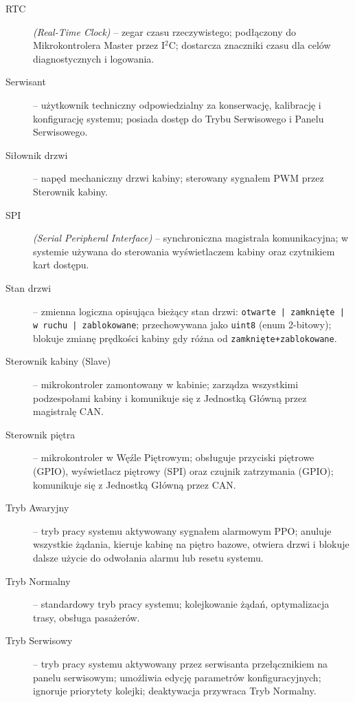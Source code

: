 \documentclass{article}
\begin{document}
\begin{description}
  \item[RTC] \textit{(Real-Time Clock)} – zegar czasu rzeczywistego; podłączony do Mikrokontrolera Master przez I$^2$C; dostarcza znaczniki czasu dla celów diagnostycznych i logowania.

  \item[Serwisant] – użytkownik techniczny odpowiedzialny za konserwację, kalibrację i konfigurację systemu; posiada dostęp do Trybu Serwisowego i Panelu Serwisowego.

  \item[Siłownik drzwi] – napęd mechaniczny drzwi kabiny; sterowany sygnałem PWM przez Sterownik kabiny.

  \item[SPI] \textit{(Serial Peripheral Interface)} – synchroniczna magistrala komunikacyjna; w systemie używana do sterowania wyświetlaczem kabiny oraz czytnikiem kart dostępu.

  \item[Stan drzwi] – zmienna logiczna opisująca bieżący stan drzwi: \texttt{otwarte | zamknięte | w ruchu | zablokowane}; przechowywana jako \texttt{uint8} (enum 2-bitowy); blokuje zmianę prędkości kabiny gdy różna od \texttt{zamknięte+zablokowane}.

  \item[Sterownik kabiny (Slave)] – mikrokontroler zamontowany w kabinie; zarządza wszystkimi podzespołami kabiny i komunikuje się z Jednostką Główną przez magistralę CAN.

  \item[Sterownik piętra] – mikrokontroler w Węźle Piętrowym; obsługuje przyciski piętrowe (GPIO), wyświetlacz piętrowy (SPI) oraz czujnik zatrzymania (GPIO); komunikuje się z Jednostką Główną przez CAN.

  \item[Tryb Awaryjny] – tryb pracy systemu aktywowany sygnałem alarmowym PPO; anuluje wszystkie żądania, kieruje kabinę na piętro bazowe, otwiera drzwi i blokuje dalsze użycie do odwołania alarmu lub resetu systemu.

  \item[Tryb Normalny] – standardowy tryb pracy systemu; kolejkowanie żądań, optymalizacja trasy, obsługa pasażerów.

  \item[Tryb Serwisowy] – tryb pracy systemu aktywowany przez serwisanta przełącznikiem na panelu serwisowym; umożliwia edycję parametrów konfiguracyjnych; ignoruje priorytety kolejki; deaktywacja przywraca Tryb Normalny.


\end{description}
\end{document}
